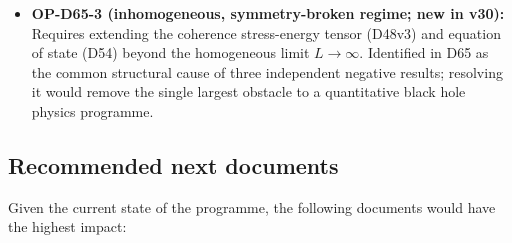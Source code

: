 \documentclass[11pt,a4paper]{article}
\theoremstyle{plain}
\theoremstyle{definition}
\theoremstyle{remark}
\begin{document}
\begin{itemize}
\item \textbf{OP-D65-3 (inhomogeneous, symmetry-broken regime; new in v30):} Requires extending the coherence stress-energy tensor (D48v3) and equation of state (D54) beyond the homogeneous limit $L\to\infty$. Identified in D65 as the common structural cause of three independent negative results; resolving it would remove the single largest obstacle to a quantitative black hole physics programme.
\end{itemize}

\subsection{Recommended next documents}
\label{subsec:nextdocs}
Given the current state of the programme, the following documents would have the highest impact:
\end{document}
